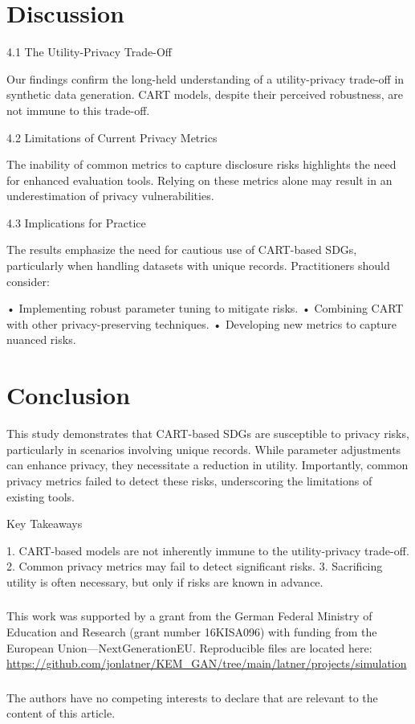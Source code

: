 \documentclass[runningheads]{llncs}
\begin{document}
\section{Discussion}


4.1 The Utility-Privacy Trade-Off

Our findings confirm the long-held understanding of a utility-privacy trade-off in synthetic data generation. CART models, despite their perceived robustness, are not immune to this trade-off.

4.2 Limitations of Current Privacy Metrics

The inability of common metrics to capture disclosure risks highlights the need for enhanced evaluation tools. Relying on these metrics alone may result in an underestimation of privacy vulnerabilities.

4.3 Implications for Practice

The results emphasize the need for cautious use of CART-based SDGs, particularly when handling datasets with unique records. Practitioners should consider:

    •   Implementing robust parameter tuning to mitigate risks.
    •   Combining CART with other privacy-preserving techniques.
    •   Developing new metrics to capture nuanced risks.

\section{Conclusion}

This study demonstrates that CART-based SDGs are susceptible to privacy risks, particularly in scenarios involving unique records. While parameter adjustments can enhance privacy, they necessitate a reduction in utility. Importantly, common privacy metrics failed to detect these risks, underscoring the limitations of existing tools.

Key Takeaways

    1.  CART-based models are not inherently immune to the utility-privacy trade-off.
    2.  Common privacy metrics may fail to detect significant risks.
    3.  Sacrificing utility is often necessary, but only if risks are known in advance.


\begin{credits}
\subsubsection{\ackname} This work was supported by a grant from the German Federal Ministry of Education and Research (grant number 16KISA096) with funding from the European Union—NextGenerationEU.  Reproducible files are located here: \url{https://github.com/jonlatner/KEM\_GAN/tree/main/latner/projects/simulation}

\subsubsection{\discintname}
The authors have no competing interests to declare that are relevant to the content of this article.
\end{credits}
\end{document}

